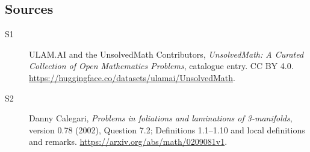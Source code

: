 \documentclass[11pt]{article}
\begin{document}
\subsection{Sources}
\begin{description}
\item[\hypertarget{source:statement:1}{S1}] ULAM.AI and the UnsolvedMath Contributors, \emph{UnsolvedMath: A Curated Collection of Open Mathematics Problems}, catalogue entry. CC BY 4.0. \url{https://huggingface.co/datasets/ulamai/UnsolvedMath}.
\item[\hypertarget{source:statement:2}{S2}] Danny Calegari, \emph{Problems in foliations and laminations of 3-manifolds}, version 0.78 (2002), Question 7.2; Definitions 1.1--1.10 and local definitions and remarks. \url{https://arxiv.org/abs/math/0209081v1}.
\end{description}
\label{end:statement}
\end{document}
